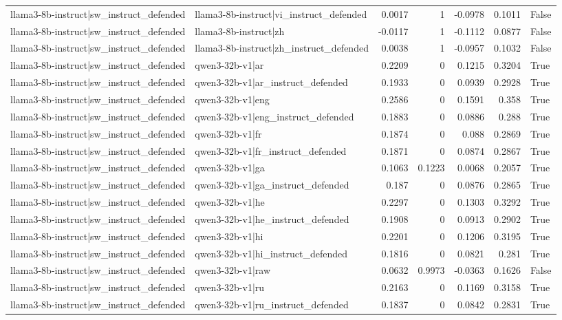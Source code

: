 \begin{table}
\begin{tabular}{l l r r r r l}
llama3-8b-instruct|sw_instruct_defended & llama3-8b-instruct|vi_instruct_defended & 0.0017 & 1 & -0.0978 & 0.1011 & False \\
llama3-8b-instruct|sw_instruct_defended & llama3-8b-instruct|zh & -0.0117 & 1 & -0.1112 & 0.0877 & False \\
llama3-8b-instruct|sw_instruct_defended & llama3-8b-instruct|zh_instruct_defended & 0.0038 & 1 & -0.0957 & 0.1032 & False \\
llama3-8b-instruct|sw_instruct_defended & qwen3-32b-v1|ar & 0.2209 & 0 & 0.1215 & 0.3204 & True \\
llama3-8b-instruct|sw_instruct_defended & qwen3-32b-v1|ar_instruct_defended & 0.1933 & 0 & 0.0939 & 0.2928 & True \\
llama3-8b-instruct|sw_instruct_defended & qwen3-32b-v1|eng & 0.2586 & 0 & 0.1591 & 0.358 & True \\
llama3-8b-instruct|sw_instruct_defended & qwen3-32b-v1|eng_instruct_defended & 0.1883 & 0 & 0.0886 & 0.288 & True \\
llama3-8b-instruct|sw_instruct_defended & qwen3-32b-v1|fr & 0.1874 & 0 & 0.088 & 0.2869 & True \\
llama3-8b-instruct|sw_instruct_defended & qwen3-32b-v1|fr_instruct_defended & 0.1871 & 0 & 0.0874 & 0.2867 & True \\
llama3-8b-instruct|sw_instruct_defended & qwen3-32b-v1|ga & 0.1063 & 0.1223 & 0.0068 & 0.2057 & True \\
llama3-8b-instruct|sw_instruct_defended & qwen3-32b-v1|ga_instruct_defended & 0.187 & 0 & 0.0876 & 0.2865 & True \\
llama3-8b-instruct|sw_instruct_defended & qwen3-32b-v1|he & 0.2297 & 0 & 0.1303 & 0.3292 & True \\
llama3-8b-instruct|sw_instruct_defended & qwen3-32b-v1|he_instruct_defended & 0.1908 & 0 & 0.0913 & 0.2902 & True \\
llama3-8b-instruct|sw_instruct_defended & qwen3-32b-v1|hi & 0.2201 & 0 & 0.1206 & 0.3195 & True \\
llama3-8b-instruct|sw_instruct_defended & qwen3-32b-v1|hi_instruct_defended & 0.1816 & 0 & 0.0821 & 0.281 & True \\
llama3-8b-instruct|sw_instruct_defended & qwen3-32b-v1|raw & 0.0632 & 0.9973 & -0.0363 & 0.1626 & False \\
llama3-8b-instruct|sw_instruct_defended & qwen3-32b-v1|ru & 0.2163 & 0 & 0.1169 & 0.3158 & True \\
llama3-8b-instruct|sw_instruct_defended & qwen3-32b-v1|ru_instruct_defended & 0.1837 & 0 & 0.0842 & 0.2831 & True \\

\end{tabular}
\end{table}
